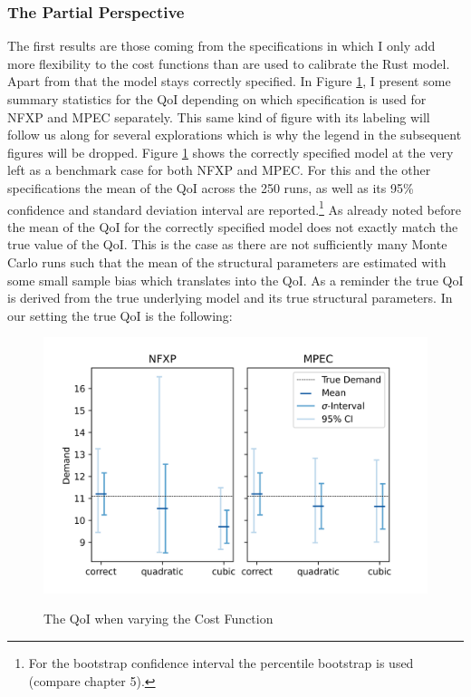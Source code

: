 \subsubsection{The Partial Perspective} \label{partial}

The first results are those coming from the specifications in which I only add more flexibility to the cost functions than are used to calibrate the Rust model. Apart from that the model stays correctly specified. In Figure \ref{figure5}, I present some summary statistics for the QoI depending on which specification is used for NFXP and MPEC separately. This same kind of figure with its labeling will follow us along for several explorations which is why the legend in the subsequent figures will be dropped. Figure \ref{figure5} shows the correctly specified model at the very left as a benchmark case for both NFXP and MPEC. For this and the other specifications the mean of the QoI across the 250 runs, as well as its 95\% confidence and standard deviation interval are reported.\footnote{ For the bootstrap confidence interval the percentile bootstrap is used (compare \cite{Davison.1997} chapter 5).} As already noted before the mean of the QoI for the correctly specified model does not exactly match the true value of the QoI. This is the case as there are not sufficiently many Monte Carlo runs such that the mean of the structural parameters are estimated with some small sample bias which translates into the QoI. As a reminder the true QoI is derived from the true underlying model and its true structural parameters. In our setting the true QoI is the following:

\begin{figure}[!t]
	\caption{The QoI when varying the Cost Function}
	\vspace*{-4mm}
	\centering
	\includegraphics[scale=0.9]{../figures/figure_5.png}
	\label{figure5}
\end{figure}

